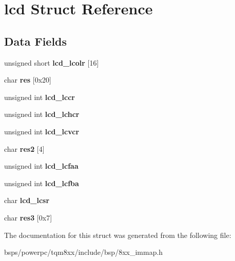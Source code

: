 \hypertarget{structlcd}{}\section{lcd Struct Reference}
\label{structlcd}
\subsection*{Data Fields}
\begin{DoxyCompactItemize}
\item 
\mbox{\label{structlcd_a4f26889b85196163979fe65596205b31}} 
unsigned short {\bfseries lcd\+\_\+lcolr} \mbox{[}16\mbox{]}
\item 
\mbox{\label{structlcd_a4b6a9f0c5cb32b54f60cc0e83c880365}} 
char {\bfseries res} \mbox{[}0x20\mbox{]}
\item 
\mbox{\label{structlcd_ab0d0a9fa04ff83c4ca47d6ed1c682fe6}} 
unsigned int {\bfseries lcd\+\_\+lccr}
\item 
\mbox{\label{structlcd_a2ccb3cd8fc9c8f2a233cff9f944d3f1c}} 
unsigned int {\bfseries lcd\+\_\+lchcr}
\item 
\mbox{\label{structlcd_a8d2b4011a6850061340ef0a58763b956}} 
unsigned int {\bfseries lcd\+\_\+lcvcr}
\item 
\mbox{\label{structlcd_adae142dfb15a4a4d554557ab7f8308db}} 
char {\bfseries res2} \mbox{[}4\mbox{]}
\item 
\mbox{\label{structlcd_a2b92f0ddf4a8482b05fed06a7ca77bf6}} 
unsigned int {\bfseries lcd\+\_\+lcfaa}
\item 
\mbox{\label{structlcd_a073009cfd111707b996efa685fad831b}} 
unsigned int {\bfseries lcd\+\_\+lcfba}
\item 
\mbox{\label{structlcd_ac1aaa18fcb55355575f6f04f2fb50261}} 
char {\bfseries lcd\+\_\+lcsr}
\item 
\mbox{\label{structlcd_af80929ce13317a1853e40190786098f2}} 
char {\bfseries res3} \mbox{[}0x7\mbox{]}
\end{DoxyCompactItemize}


The documentation for this struct was generated from the following file\+:\begin{DoxyCompactItemize}
\item 
bsps/powerpc/tqm8xx/include/bsp/8xx\+\_\+immap.\+h\end{DoxyCompactItemize}

